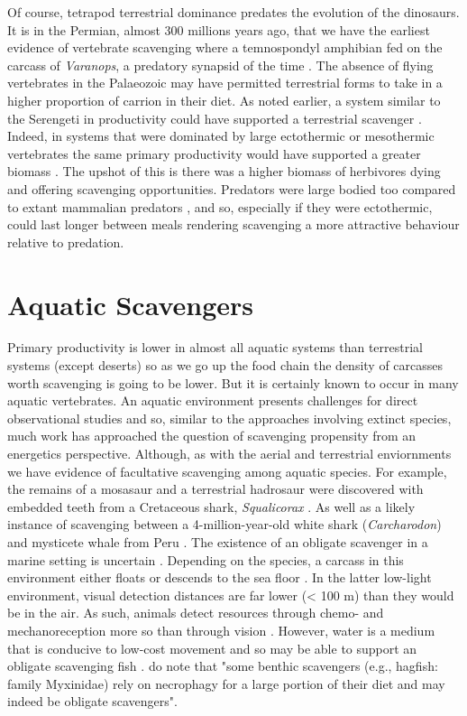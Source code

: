 \documentclass[a4paper,12pt]{article}
\begin{document}
Of course, tetrapod terrestrial dominance predates the evolution of the dinosaurs. It is in the Permian, almost 300 millions years ago, that we have the earliest evidence of vertebrate scavenging where a temnospondyl amphibian fed on the carcass of \textit{Varanops}, a predatory synapsid of the time \citep{reisz2006articulated}. The absence of flying vertebrates in the Palaeozoic may have permitted terrestrial forms to take in a higher proportion of carrion in their diet. As noted earlier, a system similar to the Serengeti in productivity could have supported a terrestrial scavenger \citep{ruxton2004obligate}. Indeed, in systems that were dominated by large ectothermic or mesothermic vertebrates 
the same primary productivity would have supported a greater biomass \citep{mcnab2009resources}. The upshot of this is there was a higher biomass of herbivores dying and offering scavenging opportunities. Predators were large bodied too compared to extant mammalian predators \citep{mcnab2009resources}, and so, especially if they were ectothermic, could last longer between meals rendering scavenging a more attractive behaviour relative to predation.  

\section*{Aquatic Scavengers} 
Primary productivity is lower in almost all aquatic systems than terrestrial systems (except deserts) so as we go up the food chain the density of carcasses worth scavenging is going to be lower. But it is certainly known to occur in many aquatic vertebrates. An aquatic environment presents challenges for direct observational studies and so, similar to the approaches involving extinct species, much work has approached the question of scavenging propensity from an energetics perspective. Although, as with the aerial and terrestrial enviornments we have evidence of facultative scavenging among aquatic species. For example, the remains of a mosasaur and a terrestrial hadrosaur were discovered with embedded teeth from a Cretaceous shark, \textit{Squalicorax} \citep{schwimmer1997scavenging}. As well as a likely instance of scavenging between a 4-million-year-old white shark (\textit{Carcharodon}) and mysticete whale from Peru \citep{ehret2009caught}.  
The existence of an obligate scavenger in a marine setting is uncertain \citep{britton1994marine,smith2003ecology,ruxton2004energetic,ruxton2005searching}. Depending on the species, a carcass in this environment either floats or descends to the sea floor \citep{Whitehead415}. In the latter low-light environment, visual detection distances are far lower (< 100 m) than they would be in the air. As such, animals detect resources through chemo- and mechanoreception more so than through vision \citep{ruxton2004energetic}. However, water is a medium that is conducive to low-cost movement \citep{tucker1975energetic} and so may be able to support an obligate scavenging fish \citep{ruxton2004energetic,ruxton2005searching}. \cite{beasley2015vertebrates} do note that "some benthic scavengers (e.g., hagfish: family Myxinidae) rely on necrophagy for a large portion of their diet and may indeed be obligate scavengers". 
\end{document}
